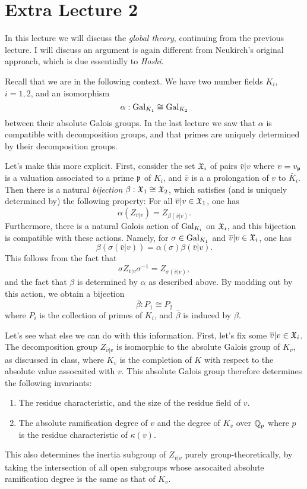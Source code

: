 \section{Extra Lecture 2}

In this lecture we will discuss the \emph{global theory}, continuing from the previous lecture.
I will discuss an argument is again different from Neukirch's original approach, which is due essentially to \emph{Hoshi}.

Recall that we are in the following context.
We have two number fields $K_{i}$, $i = 1,2$, and an isomorphism
\[ \alpha : \operatorname{Gal}_{K_{1}} \cong \operatorname{Gal}_{K_{2}} \]
between their absolute Galois groups.
In the last lecture we saw that $\alpha$ is compatible with decomposition groups, and that primes are uniquely determined by their decomposition groups.

Let's make this more explicit.
First, consider the set $\mathfrak{X}_{i}$ of pairs $\bar v|v$ where $v = v_{\mathfrak{p}}$ is a valuation associated to a prime $\mathfrak{p}$ of $K_{i}$, and $\bar v$ is a a prolongation of $v$ to $\bar K_{i}$.
Then there is a natural \emph{bijection} $\beta : \mathfrak{X}_{1} \cong \mathfrak{X}_{2}$, which satisfies (and is uniquely determined by) the following property: For all $\overline v|v \in \mathfrak{X}_{1}$, one has
\[ \alpha(Z_{\bar v|v}) = Z_{\beta(\bar v|v)}. \]
Furthermore, there is a natural Galois action of $\operatorname{Gal}_{K_{i}}$ on $\mathfrak{X}_{i}$, and this bijection is compatible with these actions.
Namely, for $\sigma \in \operatorname{Gal}_{K_{1}}$ and $\overline v|v \in \mathfrak{X}_{i}$, one has
\[ \beta(\sigma(\bar v|v)) = \alpha(\sigma)\beta(\bar v|v). \]
This follows from the fact that
\[ \sigma Z_{\bar v|v} \sigma^{-1} = Z_{\sigma(\bar v|v)}, \]
and the fact that $\beta$ is determined by $\alpha$ as described above.
By modding out by this action, we obtain a bijection
\[ \bar\beta : P_{1} \cong P_{2} \]
where $P_{i}$ is the collection of primes of $K_{i}$, and $\bar \beta$ is induced by $\beta$.

Let's see what else we can do with this information.
First, let's fix some $\overline v|v \in \mathfrak{X}_{i}$.
The decomposition group $Z_{\bar v|v}$ is isomorphic to the absolute Galois group of $K_{v}$, as discussed in class, where $K_{v}$ is the completion of $K$ with respect to the absolute value assocaited with $v$.
This absolute Galois group therefore determines the following invariants:
\begin{enumerate}
  \item The residue characteristic, and the size of the residue field of $v$.
  \item The absolute ramification degree of $v$ and the degree of $K_{v}$ over $\mathbb{Q}_{p}$ where $p$ is the residue characteristic of $\kappa(v)$.
\end{enumerate}
This also determines the inertia subgroup of $Z_{\bar v|v}$ purely group-theoretically, by taking the intersection of all open subgroups whose assocaited absolute ramification degree is the same as that of $K_{v}$.

